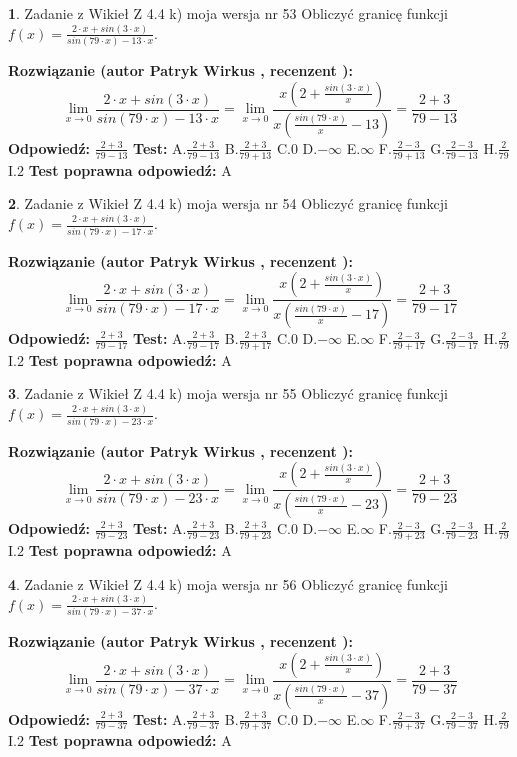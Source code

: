 \documentclass[12pt, a4paper]{article}
\theoremstyle{definition} %
\newtheorem{zad}{}
\newcommand{\zadStart}[1]{\begin{zad}#1\newline}
\newcommand{\zadStop}{\end{zad}}
\newcommand{\rozwStart}[2]{\noindent \textbf{Rozwiązanie (autor #1 , recenzent #2): }\newline}
\newcommand{\rozwStop}{\newline}
\newcommand{\odpStart}{\noindent \textbf{Odpowiedź:}\newline}
\newcommand{\odpStop}{\newline}
\newcommand{\testStart}{\noindent \textbf{Test:}\newline}
\newcommand{\testStop}{\newline}
\newcommand{\kluczStart}{\noindent \textbf{Test poprawna odpowiedź:}\newline}
\newcommand{\kluczStop}{\newline}
\begin{document}
\zadStart{Zadanie z Wikieł Z 4.4 k) moja wersja nr 53}
Obliczyć granicę funkcji $f(x)=\frac{2\cdot x +sin(3\cdot x)}{sin(79\cdot x) -13\cdot x}$.
\zadStop
\rozwStart{Patryk Wirkus}{}
$$\lim\limits_{x\to 0}\frac{2\cdot x +sin(3\cdot x)}{sin(79\cdot x) -13\cdot x}
=\lim\limits_{x\to 0}\frac{x(2+\frac{sin(3\cdot x)}{x})}{x(\frac{sin(79\cdot x)}{x}-13)}
=\frac{2+3}{79-13}$$
\rozwStop
\odpStart
$\frac{2+3}{79-13}$
\odpStop
\testStart
A.$\frac{2+3}{79-13}$
B.$\frac{2+3}{79+13}$
C.$0$
D.$-\infty$
E.$\infty$
F.$\frac{2-3}{79+13}$
G.$\frac{2-3}{79-13}$
H.$\frac{2}{79}$
I.$2$
\testStop
\kluczStart
A
\kluczStop



\zadStart{Zadanie z Wikieł Z 4.4 k) moja wersja nr 54}
Obliczyć granicę funkcji $f(x)=\frac{2\cdot x +sin(3\cdot x)}{sin(79\cdot x) -17\cdot x}$.
\zadStop
\rozwStart{Patryk Wirkus}{}
$$\lim\limits_{x\to 0}\frac{2\cdot x +sin(3\cdot x)}{sin(79\cdot x) -17\cdot x}
=\lim\limits_{x\to 0}\frac{x(2+\frac{sin(3\cdot x)}{x})}{x(\frac{sin(79\cdot x)}{x}-17)}
=\frac{2+3}{79-17}$$
\rozwStop
\odpStart
$\frac{2+3}{79-17}$
\odpStop
\testStart
A.$\frac{2+3}{79-17}$
B.$\frac{2+3}{79+17}$
C.$0$
D.$-\infty$
E.$\infty$
F.$\frac{2-3}{79+17}$
G.$\frac{2-3}{79-17}$
H.$\frac{2}{79}$
I.$2$
\testStop
\kluczStart
A
\kluczStop



\zadStart{Zadanie z Wikieł Z 4.4 k) moja wersja nr 55}
Obliczyć granicę funkcji $f(x)=\frac{2\cdot x +sin(3\cdot x)}{sin(79\cdot x) -23\cdot x}$.
\zadStop
\rozwStart{Patryk Wirkus}{}
$$\lim\limits_{x\to 0}\frac{2\cdot x +sin(3\cdot x)}{sin(79\cdot x) -23\cdot x}
=\lim\limits_{x\to 0}\frac{x(2+\frac{sin(3\cdot x)}{x})}{x(\frac{sin(79\cdot x)}{x}-23)}
=\frac{2+3}{79-23}$$
\rozwStop
\odpStart
$\frac{2+3}{79-23}$
\odpStop
\testStart
A.$\frac{2+3}{79-23}$
B.$\frac{2+3}{79+23}$
C.$0$
D.$-\infty$
E.$\infty$
F.$\frac{2-3}{79+23}$
G.$\frac{2-3}{79-23}$
H.$\frac{2}{79}$
I.$2$
\testStop
\kluczStart
A
\kluczStop



\zadStart{Zadanie z Wikieł Z 4.4 k) moja wersja nr 56}
Obliczyć granicę funkcji $f(x)=\frac{2\cdot x +sin(3\cdot x)}{sin(79\cdot x) -37\cdot x}$.
\zadStop
\rozwStart{Patryk Wirkus}{}
$$\lim\limits_{x\to 0}\frac{2\cdot x +sin(3\cdot x)}{sin(79\cdot x) -37\cdot x}
=\lim\limits_{x\to 0}\frac{x(2+\frac{sin(3\cdot x)}{x})}{x(\frac{sin(79\cdot x)}{x}-37)}
=\frac{2+3}{79-37}$$
\rozwStop
\odpStart
$\frac{2+3}{79-37}$
\odpStop
\testStart
A.$\frac{2+3}{79-37}$
B.$\frac{2+3}{79+37}$
C.$0$
D.$-\infty$
E.$\infty$
F.$\frac{2-3}{79+37}$
G.$\frac{2-3}{79-37}$
H.$\frac{2}{79}$
I.$2$
\testStop
\kluczStart
A
\kluczStop
\end{document}
